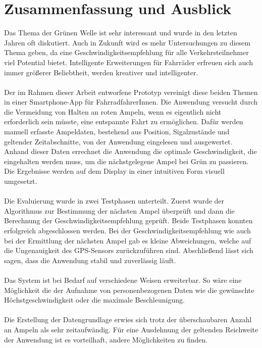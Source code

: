 \chapter{\label{chap:fazit}Zusammenfassung und Ausblick}
Das Thema der Grünen Welle ist sehr interessant und wurde in den letzten Jahren oft diskutiert. Auch in Zukunft wird es mehr Untersuchungen zu diesem Thema geben, da eine Geschwindigkeitsempfehlung für alle Verkehrsteilnehmer viel Potential bietet. Intelligente Erweiterungen für Fahrräder erfreuen sich auch immer größerer Beliebtheit, werden kreativer und intelligenter.\\\\
Der im Rahmen dieser Arbeit entworfene Prototyp vereinigt diese beiden Themen in einer \gls{Smartphone}-\gls{App} für FahrradfahrerInnen. Die Anwendung versucht durch die Vermeidung von Halten an roten Ampeln, wenn es eigentlich nicht erforderlich sein müsste, eine entspannte Fahrt zu ermöglichen. Dafür werden manuell erfasste Ampeldaten, bestehend aus Position, Sigalzustände und geltender Zeitabschnitte, von der Anwendung eingelesen und ausgewertet. Anhand dieser Daten errechnet die Anwendung die optimale Geschwindigkeit, die eingehalten werden muss, um die nächstgelegene Ampel bei Grün zu passieren. Die Ergebnisse werden auf dem Display in einer intuitiven Form visuell umgesetzt.\\\\ 
Die Evaluierung wurde in zwei Testphasen unterteilt. Zuerst wurde der Algorithmus zur Bestimmung der nächsten Ampel überprüft und dann die Berechnung der Geschwindigkeitsempfehlung geprüft. Beide Testphasen konnten erfolgreich abgeschlossen werden. Bei der Geschwindigkeitsempfehlung wie auch bei der Ermittlung der nächsten Ampel gab es kleine Abweichungen, welche auf die Ungenauigkeit des \gls{GPS}-Sensors zurückzuführen sind. Abschließend lässt sich sagen, dass die Anwendung stabil und zuverlässig läuft.\\\\
%
%
Das System ist bei Bedarf auf verschiedene Weisen erweiterbar. So wäre eine Möglichkeit die der Aufnahme von personenbezogenen Daten wie die gewünschte Höchstgeschwindigkeit oder die maximale Beschleunigung.\\\\
Die Erstellung der Datengrundlage erwies sich trotz der überschaubaren Anzahl an Ampeln als sehr zeitaufwändig. Für eine Ausdehnung der geltenden Reichweite der Anwendung ist es vorteilhaft, andere Möglichkeiten zu finden.\\ 
